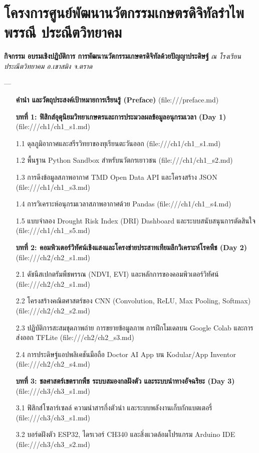 \documentclass[11pt,a4paper,openany]{report}
\begin{document}
\section{โครงการศูนย์พัฒนานวัตกรรมเกษตรดิจิทัลรำไพพรรณี ประณีตวิทยาคม}

\textbf{กิจกรรม อบรมเชิงปฏิบัติการ การพัฒนานวัตกรรมเกษตรดิจิทัลด้วยปัญญาประดิษฐ์}
\textit{ณ โรงเรียนประณีตวิทยาคม อ.เขาสมิง จ.ตราด}

---

\begin{itemize}
  \item [\textbf{คำนำ และวัตถุประสงค์เป้าหมายการเรียนรู้ (Preface)}](file:///preface.md)
  \item [\textbf{บทที่ 1: ฟิสิกส์อุตุนิยมวิทยาเกษตรและการประมวลผลข้อมูลอนุกรมเวลา (Day 1)}](file:///ch1/ch1\_s1.md)
  \item [1.1 ดุลภูมิอากาศและสรีรวิทยาของทุเรียนตะวันออก](file:///ch1/ch1\_s1.md)
  \item [1.2 พื้นฐาน Python Sandbox สำหรับนวัตกรเยาวชน](file:///ch1/ch1\_s2.md)
  \item [1.3 การดึงข้อมูลสภาพอากาศ TMD Open Data API และโครงสร้าง JSON](file:///ch1/ch1\_s3.md)
  \item [1.4 การวิเคราะห์อนุกรมเวลาสภาพอากาศด้วย Pandas](file:///ch1/ch1\_s4.md)
  \item [1.5 แบบจำลอง Drought Risk Index (DRI) Dashboard และระบบสนับสนุนการตัดสินใจ](file:///ch1/ch1\_s5.md)
  \item [\textbf{บทที่ 2: คอมพิวเตอร์วิทัศน์เชิงแสงและโครงข่ายประสาทเทียมลึกวิเคราะห์โรคพืช (Day 2)}](file:///ch2/ch2\_s1.md)
  \item [2.1 ดัชนีสเปกตรัมพืชพรรณ (NDVI, EVI) และหลักการของคอมพิวเตอร์วิทัศน์](file:///ch2/ch2\_s1.md)
  \item [2.2 โครงสร้างคณิตศาสตร์ของ CNN (Convolution, ReLU, Max Pooling, Softmax)](file:///ch2/ch2\_s2.md)
  \item [2.3 ปฏิบัติการสะสมชุดภาพถ่าย การขยายข้อมูลภาพ การฝึกโมเดลบน Google Colab และการส่งออก TFLite](file:///ch2/ch2\_s3.md)
  \item [2.4 การประดิษฐ์แอปพลิเคชันมือถือ Doctor AI App บน Kodular/App Inventor](file:///ch2/ch2\_s4.md)
  \item [\textbf{บทที่ 3: ชลศาสตร์เขตรากพืช ระบบสมองกลฝังตัว และระบบนำทางอัจฉริยะ (Day 3)}](file:///ch3/ch3\_s1.md)
  \item [3.1 ฟิสิกส์โซลาร์เซลล์ ความนำสารกึ่งตัวนำ และระบบพลังงานเก็บกักแบตเตอรี่](file:///ch3/ch3\_s1.md)
  \item [3.2 บอร์ดฝังตัว ESP32, ไดรเวอร์ CH340 และสิ่งแวดล้อมโปรแกรม Arduino IDE](file:///ch3/ch3\_s2.md)

\end{itemize}
\end{document}
